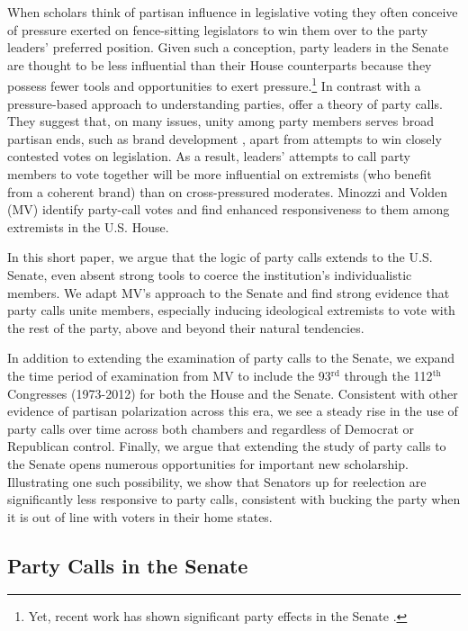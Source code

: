 \documentclass[12pt]{article}
\begin{document}
\noindent When scholars think of partisan influence in legislative voting they often conceive of pressure exerted on fence-sitting legislators to win them over to the party leaders' preferred position.  Given such a conception, party leaders in the Senate are thought to be less influential than their House counterparts because they possess fewer tools and opportunities to exert pressure.\footnote{\doublespacing\normalsize Yet, recent work has shown significant party effects in the Senate \citep[e.g.,][]{Gailmard:2007, Monroe:2008, Patty:2008, Volden:2006}.}  In contrast with a pressure-based approach to understanding parties, \cite{Minozzi:2013} offer a theory of party calls.  They suggest that, on many issues, unity among party members serves broad partisan ends, such as brand development \citep[e.g.,][]{Snyder:2002}, apart from attempts to win closely contested votes on legislation.  As a result, leaders' attempts to call party members to vote together will be more influential on extremists (who benefit from a coherent brand) than on cross-pressured moderates.  Minozzi and Volden (MV) identify party-call votes and find enhanced responsiveness to them among extremists in the U.S. House.

In this short paper, we argue that the logic of party calls extends to the U.S. Senate, even absent strong tools to coerce the institution's individualistic members.  We adapt MV's approach to the Senate and find strong evidence that party calls unite members, especially inducing ideological extremists to vote with the rest of the party, above and beyond their natural tendencies.

In addition to extending the examination of party calls to the Senate, we expand the time period of examination from MV to include the 93$^{\text{rd}}$ through the 112$^{\text{th}}$ Congresses (1973-2012) for both the House and the Senate. Consistent with other evidence of partisan polarization across this era, we see a steady rise in the use of party calls over time across both chambers and regardless of Democrat or Republican control. Finally, we argue that extending the study of party calls to the Senate opens numerous opportunities for important new scholarship.  Illustrating one such possibility, we show that Senators up for reelection are significantly less responsive to party calls, consistent with bucking the party when it is out of line with voters in their home states.


\subsection*{Party Calls in the Senate}
\end{document}

